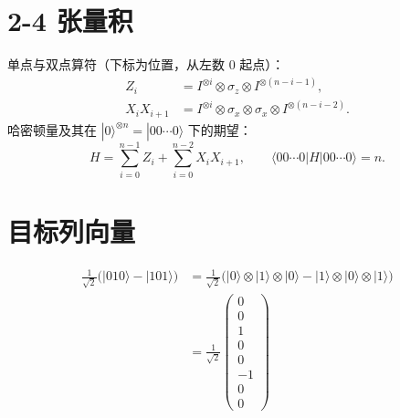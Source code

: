 \documentclass[11pt, a4paper]{ctexart}
\newcommand{\ket}[1]{|#1\rangle}
\newcommand{\mel}[3]{\langle#1|#2|#3\rangle}
\newcommand{\tg}{\otimes}
\begin{document}
\section{2-4 张量积}

单点与双点算符（下标为位置，从左数 0 起点）：
\begin{align}
Z_i &= I^{\tg i}\tg\sigma_z\tg I^{\tg(n-i-1)},\\
X_i X_{i+1} &= I^{\tg i}\tg\sigma_x\tg\sigma_x\tg I^{\tg(n-i-2)}.
\end{align}
哈密顿量及其在 $\ket{0}^{\tg n}=\ket{00\cdots0}$ 下的期望：
\begin{equation}
H=\sum_{i=0}^{n-1} Z_i+\sum_{i=0}^{n-2} X_iX_{i+1},
\qquad
\mel{00\cdots0}{H}{00\cdots0}=n.
\end{equation}

\section{目标列向量}

\begin{align}
\frac{1}{\sqrt{2}}\bigl(\ket{010}-\ket{101}\bigr)
&=\frac{1}{\sqrt{2}}\bigl(\ket{0}\tg\ket{1}\tg\ket{0}-\ket{1}\tg\ket{0}\tg\ket{1}\bigr)\\
&=\frac{1}{\sqrt{2}}
\begin{pmatrix}0\\0\\1\\0\\0\\-1\\0\\0\end{pmatrix}
\end{align}
\end{document}
